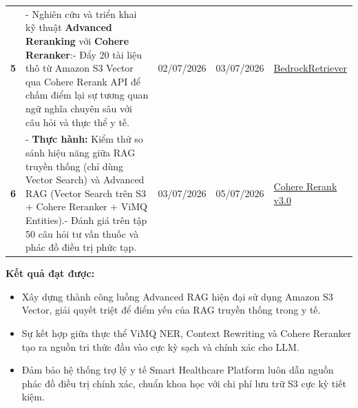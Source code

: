 \begin{longtable}[]
{API} \\
\textbf{5} & - Nghiên cứu và triển khai kỹ thuật \textbf{Advanced
Reranking} với \textbf{Cohere Reranker}:- Đẩy 20 tài liệu thô từ Amazon
S3 Vector qua Cohere Rerank API để chấm điểm lại sự tương quan ngữ nghĩa
chuyên sâu với câu hỏi và thực thể y tế. & 02/07/2026 & 03/07/2026 &
\href{https://python.langchain.com/v0.2/docs/integrations/retrievers/bedrock/}{BedrockRetriever} \\
\textbf{6} & - \textbf{Thực hành:} Kiểm thử so sánh hiệu năng giữa RAG
truyền thống (chỉ dùng Vector Search) và Advanced RAG (Vector Search
trên S3 + Cohere Reranker + ViMQ Entities).- Đánh giá trên tập 50 câu
hỏi tư vấn thuốc và phác đồ điều trị phức tạp. & 03/07/2026 & 05/07/2026
& \href{https://docs.cohere.com/docs/rerank-2}{Cohere Rerank v3.0} \\
\end{longtable}
\endgroup

\vspace{0.5em}\noindent\textbf{Kết quả đạt được:}

\begin{itemize}
\tightlist
\item
  Xây dựng thành công luồng Advanced RAG hiện đại sử dụng Amazon S3
  Vector, giải quyết triệt để điểm yếu của RAG truyền thống trong y tế.
\item
  Sự kết hợp giữa thực thể ViMQ NER, Context Rewriting và Cohere
  Reranker tạo ra nguồn tri thức đầu vào cực kỳ sạch và chính xác cho
  LLM.
\item
  Đảm bảo hệ thống trợ lý y tế Smart Healthcare Platform luôn dẫn nguồn
  phác đồ điều trị chính xác, chuẩn khoa học với chi phí lưu trữ S3 cực
  kỳ tiết kiệm.
\end{itemize}
